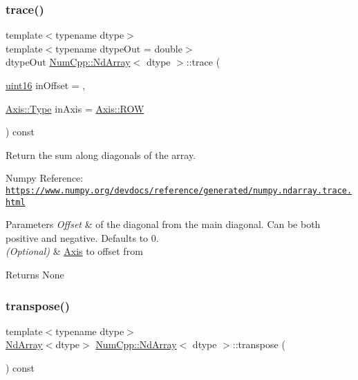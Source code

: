 \subsubsection{\texorpdfstring{trace()}{trace()}}
{\footnotesize\ttfamily template$<$typename dtype$>$ \\
template$<$typename dtype\+Out  = double$>$ \\
dtype\+Out \mbox{\hyperlink{class_num_cpp_1_1_nd_array}{Num\+Cpp\+::\+Nd\+Array}}$<$ dtype $>$\+::trace (\begin{DoxyParamCaption}\item[{\mbox{\hyperlink{namespace_num_cpp_a3078cddd091529b8dd3e7828fa9a9926}{uint16}}}]{in\+Offset = {},  }\item[{\mbox{\hyperlink{struct_num_cpp_1_1_axis_ac10eb76f8631762d9ed70c40c42ca6cb}{Axis\+::\+Type}}}]{in\+Axis = {\ttfamily \mbox{\hyperlink{struct_num_cpp_1_1_axis_ac10eb76f8631762d9ed70c40c42ca6cbad9f2ab1396aad2412d9c77fbcbbe6aca}{Axis\+::\+R\+OW}}} }\end{DoxyParamCaption}) const\hspace{0.3cm}{\ttfamily [inline]}}

Return the sum along diagonals of the array.

Numpy Reference\+: \href{https://www.numpy.org/devdocs/reference/generated/numpy.ndarray.trace.html}{\tt https\+://www.\+numpy.\+org/devdocs/reference/generated/numpy.\+ndarray.\+trace.\+html}


\begin{DoxyParams}{Parameters}
{\em Offset} & of the diagonal from the main diagonal. Can be both positive and negative. Defaults to 0. \\
\hline
{\em (\+Optional)} & \mbox{\hyperlink{struct_num_cpp_1_1_axis}{Axis}} to offset from\\
\hline
\end{DoxyParams}
\begin{DoxyReturn}{Returns}
None 
\end{DoxyReturn}
\mbox{\label{class_num_cpp_1_1_nd_array_a017f44fb835480793546da61477f3e61}} 
\subsubsection{\texorpdfstring{transpose()}{transpose()}}
{\footnotesize\ttfamily template$<$typename dtype$>$ \\
\mbox{\hyperlink{class_num_cpp_1_1_nd_array}{Nd\+Array}}$<$dtype$>$ \mbox{\hyperlink{class_num_cpp_1_1_nd_array}{Num\+Cpp\+::\+Nd\+Array}}$<$ dtype $>$\+::transpose (\begin{DoxyParamCaption}{ }\end{DoxyParamCaption}) const\hspace{0.3cm}{\ttfamily [inline]}}

